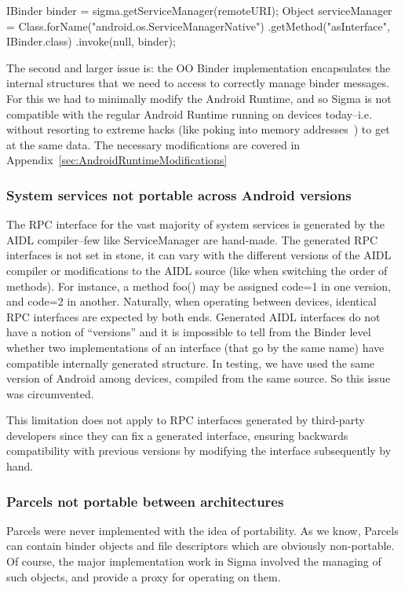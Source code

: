 \documentclass[prodmode]{acmlarge}
\begin{document}
\begin{snippet}
IBinder binder = sigma.getServiceManager(remoteURI);
Object serviceManager = Class.forName("android.os.ServiceManagerNative")
                    .getMethod("asInterface", IBinder.class)
                    .invoke(null, binder);
\end{snippet}

The second and larger issue is: the OO Binder implementation encapsulates the internal structures that we need to access to correctly manage binder messages. For this we had to minimally modify the Android Runtime, and so Sigma is not compatible with the regular Android Runtime running on devices today--i.e. without resorting to extreme hacks (like poking into memory addresses~\cite{FacebookDalvikHacks}) to get at the same data. The necessary modifications are covered in Appendix~\ref{sec:AndroidRuntimeModifications}

\subsubsection{System services not portable across Android versions}
The RPC interface for the vast majority of system services is generated by the AIDL compiler--few like ServiceManager are hand-made. The generated RPC interfaces is not set in stone, it can vary with the different versions of the AIDL compiler or modifications to the AIDL source (like when switching the order of methods). For instance, a method foo() may be assigned code=1 in one version, and code=2 in another. Naturally, when operating between devices, identical RPC interfaces are expected by both ends. Generated AIDL interfaces do not have a notion of ``versions'' and it is impossible to tell from the Binder level whether two implementations of an interface (that go by the same name) have compatible internally generated structure. In testing, we have used the same version of Android among devices, compiled from the same source. So this issue was circumvented.

This limitation does not apply to RPC interfaces generated by third-party developers since they can fix a generated interface, ensuring backwards compatibility with previous versions by modifying the interface subsequently by hand.

\subsubsection{Parcels not portable between architectures}
Parcels were never implemented with the idea of portability. As we know, Parcels can contain binder objects and file descriptors which are obviously non-portable. Of course, the major implementation work in Sigma involved the managing of such objects, and provide a proxy for operating on them.
\end{document}
